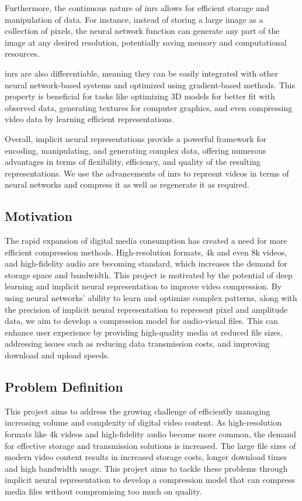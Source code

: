 \documentclass{ioereport}
\begin{document}
    Furthermore, the continuous nature of \gls{inr}s allows for efficient storage and manipulation of data. For instance, instead of storing a large image as a collection of pixels, the neural network function can generate any part of the image at any desired resolution, potentially saving memory and computational resources.
    
    \gls{inr}s are also differentiable, meaning they can be easily integrated with other neural network-based systems and optimized using gradient-based methods. This property is beneficial for tasks like optimizing 3D models for better fit with observed data, generating textures for computer graphics, and even compressing video data by learning efficient representations.
    
    Overall, implicit neural representations provide a powerful framework for encoding, manipulating, and generating complex data, offering numerous advantages in terms of flexibility, efficiency, and quality of the resulting representations.
    We use the advancements of \gls{inr}s to represnt videos in terms of neural networks and compress it as well as regenerate it as required.
    
    \subsection{Motivation}
    The rapid expansion of digital media consumption has created a need for more efficient compression methods. High-resolution formats, 4k and even 8k videos, and high-fidelity audio are becoming standard, which increases the demand for storage space and bandwidth. This project is motivated by the potential of deep learning and implicit neural representation to improve video compression. By using neural networks' ability to learn and optimize complex patterns, along with the precision of implicit neural representation to represent pixel and amplitude data, we aim to develop a compression model for audio-visual files. This can enhance user experience by providing high-quality media at reduced file sizes, addressing issues such as reducing data transmission costs, and improving download and upload speeds.
    
    \subsection{Problem Definition}
    This project aims to address the growing challenge of efficiently managing increasing volume and complexity of digital video content. As high-resolution formats like 4k videos and high-fidelity audio become more common, the demand for effective storage and transmission solutions is increased. The large file sizes of modern video content results in increased storage costs, longer download times and high bandwidth usage. This project aims to tackle these problems through implicit neural representation to develop a compression model that can compress media files without compromising too much on quality.
    
\end{document}
